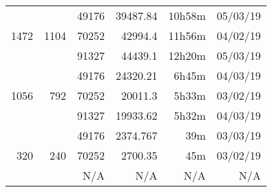\begin{center}
\begin{tabular}{ r r r | r r r }
  \hline
  \multirow{3}{*}{1472} & \multirow{3}{*}{1104} & 49176 & 39487.84 & 10h58m & 05/03/19 \\
  & & 70252 & 42994.4 & 11h56m & 04/02/19 \\
  & & 91327 & 44439.1 & 12h20m & 05/03/19 \\
  \hline
  \multirow{3}{*}{1056} & \multirow{3}{*}{792} & 49176 & 24320.21 & 6h45m & 04/03/19 \\
  & & 70252 & 20011.3 & 5h33m & 03/02/19 \\
  & & 91327 & 19933.62 & 5h32m & 04/03/19 \\
  \hline
  \multirow{3}{*}{320} & \multirow{3}{*}{240} & 49176 & 2374.767 & 39m & 03/03/19 \\
  & & 70252 & 2700.35 & 45m & 03/02/19 \\
  & & N/A & N/A & N/A & N/A \\
  \end{tabular}
  \end{center}
  
\newpage
